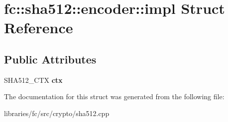 \hypertarget{structfc_1_1sha512_1_1encoder_1_1impl}{}\section{fc\+:\+:sha512\+:\+:encoder\+:\+:impl Struct Reference}
\label{structfc_1_1sha512_1_1encoder_1_1impl}
\subsection*{Public Attributes}
\begin{DoxyCompactItemize}
\item 
\mbox{\label{structfc_1_1sha512_1_1encoder_1_1impl_a1e56adb50bb113e8884d2166b950c022}} 
S\+H\+A512\+\_\+\+C\+TX {\bfseries ctx}
\end{DoxyCompactItemize}


The documentation for this struct was generated from the following file\+:\begin{DoxyCompactItemize}
\item 
libraries/fc/src/crypto/sha512.\+cpp\end{DoxyCompactItemize}
